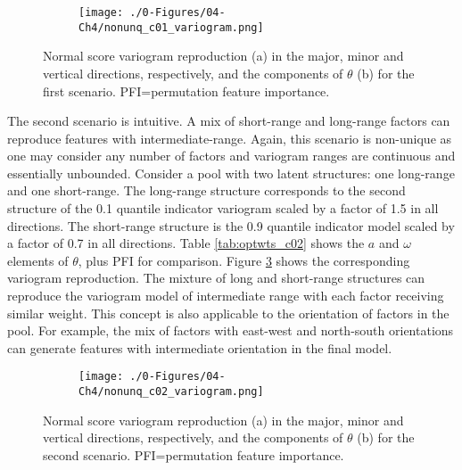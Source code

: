 \begin{figure}
    \begin{subfigure}{1.\textwidth}
        \centering
        \texttt{[image: ./0-Figures/04-Ch4/nonunq\_c01\_variogram.png]}
        \caption{}
        \label{fig:nonunq_c01_variogram}
    \end{subfigure}
    \begin{subtable}{1.\textwidth}
        \centering
        \resizebox{1\width}{!}{}
        \caption{}
        \label{tab:optwts_c01}
    \end{subtable}
    \caption{Normal score variogram reproduction (a) in the major, minor and vertical directions, respectively, and the components of $\theta$ (b) for the first scenario. PFI=permutation feature importance. }
    \label{}
\end{figure}

The second scenario is intuitive. A mix of short-range and long-range factors can reproduce features with intermediate-range. Again, this scenario is non-unique as one may consider any number of factors and variogram ranges are continuous and essentially unbounded. Consider a pool with two latent structures: one long-range and one short-range. The long-range structure corresponds to the second structure of the 0.1 quantile indicator variogram scaled by a factor of 1.5 in all directions. The short-range structure is the 0.9 quantile indicator model scaled by a factor of 0.7 in all directions. Table \ref{tab:optwts_c02} shows the $a$ and $\omega$ elements of $\theta$, plus \gls{PFI} for comparison. Figure \ref{fig:nonunq_c02_variogram} shows the corresponding variogram reproduction. The mixture of long and short-range structures can reproduce the variogram model of intermediate range with each factor receiving similar weight. This concept is also applicable to the orientation of factors in the pool. For example, the mix of factors with east-west and north-south orientations can generate features with intermediate orientation in the final model.

\begin{figure}
    \begin{subfigure}{1.\textwidth}
        \centering
        \texttt{[image: ./0-Figures/04-Ch4/nonunq\_c02\_variogram.png]}
        \caption{}
        \label{fig:nonunq_c02_variogram}
    \end{subfigure}
    \begin{subtable}{1.\textwidth}
        \centering
        \resizebox{1\width}{!}{}
        \caption{}
        \label{tab:optwts_c02}
    \end{subtable}
    \caption{Normal score variogram reproduction (a) in the major, minor and vertical directions, respectively, and the components of $\theta$ (b) for the second scenario. PFI=permutation feature importance. }
    \label{}
\end{figure}

